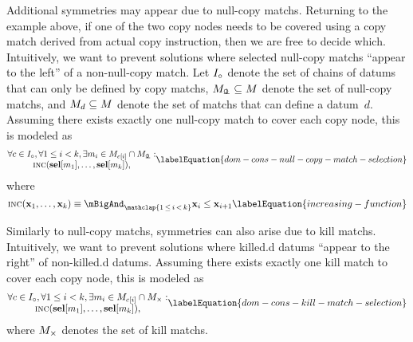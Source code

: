 Additional symmetries may appear due to \glspl{null-copy match}.
%
Returning to the example above, if one of the two \glspl{copy node} needs to be
covered using a \gls{copy match} derived from actual copy \gls{instruction},
then we are free to decide which.
%
Intuitively, we want to prevent \glspl{solution} where selected \glspl{null-copy
  match} ``appear to the left'' of a non-\gls{null-copy match}.
%
Let $\mInterchDataSet[\mCopy]$ denote the set of chains of \glspl{datum} that
can only be defined by \glspl{copy match}, \mbox{$\mNullCopyMatchSet \subseteq
  \mMatchSet$} denote the set of \glspl{null-copy match}, and
\mbox{$\mMatchSet[d] \subseteq \mMatchSet$} denote the set of \glspl{match} that
can define a \gls{datum}~$d$\hspace{-.8pt}.
%
Assuming there exists exactly one \gls{null-copy match} to cover each \gls{copy
  node}, this is modeled as
%
\begin{equation}
  \begin{array}{@{}c@{}}
    \forall c \in \mInterchDataSet[\mCopy],
    \forall 1 \leq i < k,
    \exists m_i \in \mMatchSet[c[i]] \cap \mNullCopyMatchSet : \\
    \mIncreasing(\mVar{sel}[m_1], \ldots, \mVar{sel}[m_k]),
  \end{array}
  \labelEquation{dom-cons-null-copy-match-selection}
\end{equation}
%
where
%
\begin{equation}
  \mIncreasing(\mVar{x}_1, \ldots, \mVar{x}_k)
  \equiv
  \mBigAnd_{\mathclap{1 \,\leq\, i \,<\, k}}
  \mVar{x}_{i} \leq \mVar{x}_{i + 1}
  \labelEquation{increasing-function}
\end{equation}

Similarly to \glspl{null-copy match}, symmetries can also arise due to
\glspl{kill match}.
%
Intuitively, we want to prevent \glspl{solution} where \gls{killed.d}
\glspl{datum} ``appear to the right'' of non-\gls{killed.d} \glspl{datum}.
%
Assuming there exists exactly one \gls{kill match} to cover each \gls{copy
  node}, this is modeled as
%
\begin{equation}
  \begin{array}{@{}c@{}}
    \forall c \in \mInterchDataSet[\mCopy],
    \forall 1 \leq i < k,
    \exists m_i \in \mMatchSet[c[i]] \cap \mKillMatchSet : \\
    \mIncreasing(\mVar{sel}[m_1], \ldots, \mVar{sel}[m_k]),
  \end{array}
  \labelEquation{dom-cons-kill-match-selection}
\end{equation}
%
where $\mKillMatchSet$ denotes the set of \glspl{kill match}.


